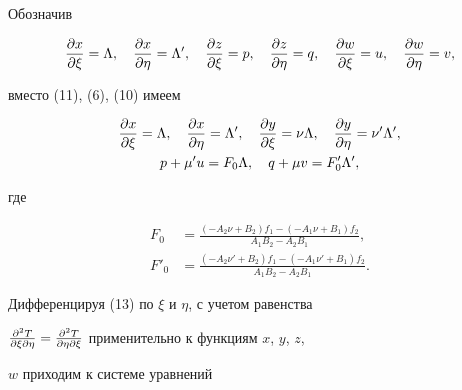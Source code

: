 Обозначив 


\begin{equation} 


\myfrac{x}{\xi}=\Lambda,\quad \myfrac{x}{\eta}=\Lambda',\quad 


\myfrac{z}{\xi}=p,\quad \myfrac{z}{\eta}=q, \quad


\myfrac{w}{\xi}=u,\quad \myfrac{w}{\eta}=v,


\end{equation} 


вместо (11), (6), (10) имеем 


\begin{gather} 


\myfrac{x}{\xi}=\Lambda,\quad \myfrac{x}{\eta}=\Lambda',\quad 


\myfrac{y}{\xi}=\nu\Lambda,\quad \myfrac{y}{\eta}=\nu'\Lambda', \\ 


% 


p+\mu'u=F_0\Lambda,\quad q+\mu v=F'_0\Lambda'\notag, 


\end{gather} 


где 


\begin{align*} 


F_0&=\frac{(-A_2\nu+B_2)f_1-(-A_1\nu+B_1)f_2} 


{A_1B_2-A_2B_1}, \\ 


% 


F'_0&=\frac{(-A_2\nu'+B_2)f_1-(-A_1\nu'+B_1)f_2} 


{A_1B_2-A_2B_1}. 


\end{align*} 


Дифференцируя (13) по $\xi$ и $\eta$, с учетом равенства 


$\myfrac{^2T}{\xi\partial \eta}= 


\myfrac{^2T}{\eta\partial\xi}$ применительно к функциям $x$, $y$, $z$, 


$w$ приходим к системе уравнений 


